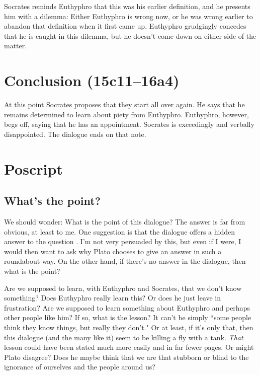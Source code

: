 \documentclass[12pt]{article}
\begin{document}
Socrates reminds Euthyphro that this was his earlier definition, and he
presents him with a dilemma: Either Euthyphro is wrong now, or he was wrong
earlier to abandon that definition when it first came up.  Euthyphro grudgingly
concedes that he is caught in this dilemma, but he doesn't come down on either
side of the matter.



\section{Conclusion (15c11--16a4)}

At this point Socrates proposes that they start all over again.  He says that
he remains determined to learn about piety from Euthyphro.  Euthyphro, however,
begs off, saying that he has an appointment.  Socrates is exceedingly and
verbally disappointed. The dialogue ends on that note.


\section{Poscript}

\subsection{What's the point?}

We should wonder: What is the point of this dialogue?  The answer is far from
obvious, at least to me.  One suggestion is that the dialogue offers a hidden
answer to the question .  I'm not very persuaded by
this, but even if I were, I would then want to ask why Plato chooses to give an
answer in such a roundabout way.  On the other hand, if there's no answer in
the dialogue, then what is the point?

Are we supposed to learn, with Euthyphro and Socrates, that we don't know
something?  Does Euthyphro really learn this?  Or does he just leave in
frustration?  Are we supposed to learn something about Euthyphro and perhaps
other people like him?  If so, what is the lesson?  It can't be simply ``some
people think they know things, but really they don't."  Or at least, if it's
only that, then this dialogue (and the many like it) seem to be killing a fly
with a tank.  \emph{That} lesson could have been stated much more easily and in
far fewer pages.  Or might Plato disagree?  Does he maybe think that we are
that stubborn or blind to the ignorance of ourselves and the people around us?
\end{document}

